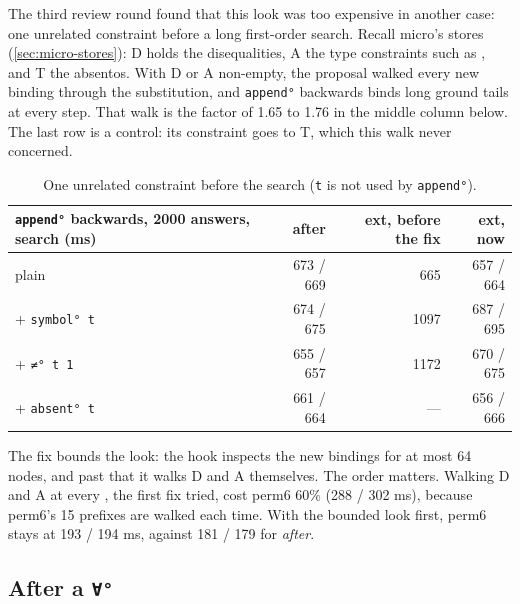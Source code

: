 The third review round found that this look was too expensive in another case: one unrelated constraint
before a long first-order search. Recall micro's stores (\cref{sec:micro-stores}): D holds the
disequalities, A the type constraints such as , and T the absentos. With D or A non-empty,
the proposal walked every new binding through the substitution, and \texttt{append°} backwards binds
long ground tails at every step. That walk is the factor of 1.65 to 1.76 in the middle column below. The last row is a control: its constraint goes to T,
which this walk never concerned.
\begin{table}[h]
\small
\caption{One unrelated constraint before the search (\texttt{t} is not used by \texttt{append°}).}\label{tab:roadmap-perf-DA}
\begin{tabular}{@{}>{\raggedright\arraybackslash}p{30mm}rrr@{}}
\toprule
\texttt{append°} backwards, 2000 answers, search (ms) & after & ext, before the fix & ext, now \\
\midrule
plain & 673 / 669 & 665 & 657 / 664 \\
+ \texttt{symbol° t} & 674 / 675 & 1097 & 687 / 695 \\
+ \texttt{≠° t 1} & 655 / 657 & 1172 & 670 / 675 \\
+ \texttt{absent° t} & 661 / 664 & --- & 656 / 666 \\
\bottomrule
\end{tabular}
\end{table}
The fix bounds the look: the hook inspects the new bindings for at most 64 nodes, and past that it walks
D and A themselves. The order matters. Walking D and A at every , the first fix tried, cost perm6
60\% (288 / 302 ms), because perm6's 15 prefixes are walked each time. With the bounded look first,
perm6 stays at 193 / 194 ms, against 181 / 179 for \emph{after}.

\subsection{After a \texttt{∀°}}\label{sec:roadmap-perf-forall}

